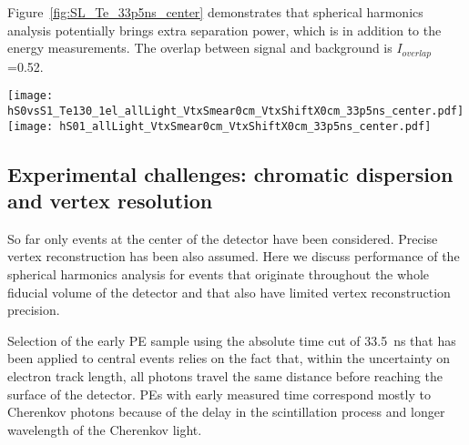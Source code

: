 Figure~\ref{fig:SL_Te_33p5ns_center} demonstrates that spherical harmonics analysis potentially brings extra separation power, which 
is in addition to the energy measurements. The overlap between signal and background is $I_{overlap}$=0.52.


\begin{figure*}[h]
  \centering
  \texttt{[image: hS0vsS1\_Te130\_1el\_allLight\_VtxSmear0cm\_VtxShiftX0cm\_33p5ns\_center.pdf]}
  \texttt{[image: hS01\_allLight\_VtxSmear0cm\_VtxShiftX0cm\_33p5ns\_center.pdf]}
  \caption{\emph{Left:} Scatter plot of $S_0$ versus $S_1$ for a simulation of 1000 signal (\emph{red crosses}) and background 
    (\emph{blue triangles}) events.
    Central events assuming perfect reconstruction of vertex position. Time cut of 33.5~ns on the PE arrival time is
    applied. The default QE and 100\% photo-coverage is used in the simulation.
    Black dashed line corresponds to a linear fit to define 1-D variable $S_{01}$ (see text for details).
    \emph{Right:} Comparison of the $S_{01}$ distribution between signal (\emph{red solid line}) and background (\emph{blue dashed line}).
    $I_{overlap}$=0.52.}
\label{fig:SL_Te_33p5ns_center}
\end{figure*}


\subsection{Experimental challenges: chromatic dispersion and vertex resolution}

So far only events at the center of the detector have been considered. Precise vertex reconstruction has been also assumed. 
Here we discuss performance of the spherical harmonics analysis for events that originate throughout the whole fiducial volume
of the detector and that also have limited vertex reconstruction precision.

Selection of the early PE sample using the absolute time cut of 33.5~ns that has been applied to central events relies on the fact that, 
within the uncertainty on electron track length, all photons travel the same distance before reaching the surface of the detector. 
PEs with early measured time correspond mostly to Cherenkov photons because of the delay in the scintillation process and longer 
wavelength of the Cherenkov light. 


